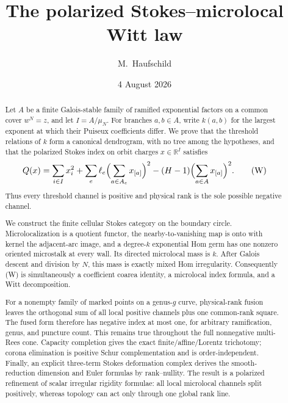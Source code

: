 \documentclass[11pt,a4paper]{amsart}
\theoremstyle{plain}
\theoremstyle{definition}
\newcommand{\RR}{\mathbb R}
\begin{document}
\title[The Stokes--microlocal Witt law]{The polarized Stokes--microlocal Witt law}

\author{M.~Haufschild}
\address{Independent researcher}
\date{4 August 2026}


\begin{abstract}
Let $A$ be a finite Galois-stable family of ramified exponential factors on a common cover
$w^N=z$, and let $I=A/\mu_N$.  For branches $a,b\in A$, write $k(a,b)$ for the largest exponent at
which their Puiseux coefficients differ.  We prove that the threshold relations of $k$ form a
canonical dendrogram, with no tree among the hypotheses, and that the polarized Stokes index on
orbit charges $x\in\RR^I$ satisfies
\[
 Q(x)=\sum_{i\in I}x_i^2+
      \sum_e\ell_e\Bigl(\sum_{a\in A_e}x_{[a]}\Bigr)^2
      -(H-1)\Bigl(\sum_{a\in A}x_{[a]}\Bigr)^2.                 \tag{W}
\]
Thus every threshold channel is positive and physical rank is the sole possible negative channel.

We construct the finite cellular Stokes category on the boundary circle.  Microlocalization is a
quotient functor, the nearby-to-vanishing map is onto with kernel the adjacent-arc image, and a
degree-$k$ exponential Hom germ has one nonzero oriented microstalk at every wall.  Its directed
microlocal mass is $k$.  After Galois descent and division by $N$, this mass is exactly mixed Hom
irregularity.  Consequently (W) is simultaneously a coefficient coarea identity, a microlocal
index formula, and a Witt decomposition.

For a nonempty family of marked points on a genus-$g$ curve, physical-rank fusion leaves the
orthogonal sum of all local positive channels plus one common-rank square.  The fused form therefore
has negative index at most one, for arbitrary ramification, genus, and puncture count.  This remains
true throughout the full nonnegative multi-Rees cone.  Capacity completion gives the exact
finite/affine/Lorentz trichotomy; corona elimination is positive Schur complementation and is
order-independent.  Finally, an explicit three-term Stokes deformation complex derives the
smooth-reduction dimension and Euler formulas by rank--nullity.  The result is a polarized
refinement of scalar irregular rigidity formulae: all local microlocal channels split positively,
whereas topology can act only through one global rank line.
\end{abstract}
\end{document}
